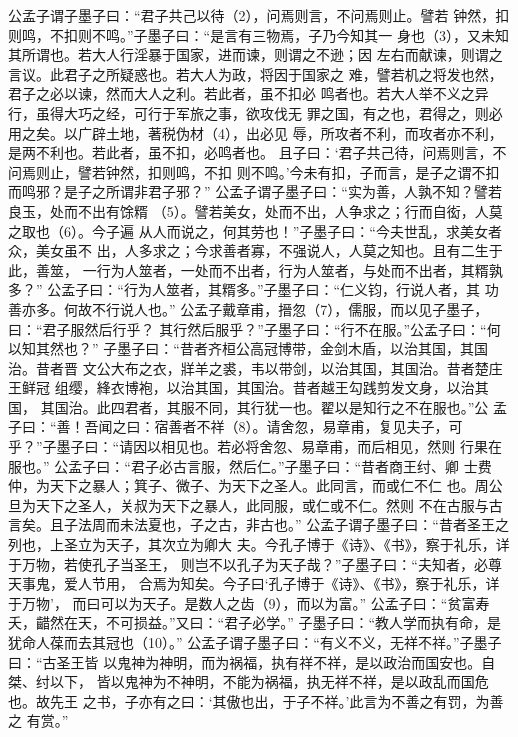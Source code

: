 \documentclass[12pt,UTF8]{ctexbook}
\begin{document}
公孟子谓子墨子曰：“君子共己以待（2），问焉则言，不问焉则止。譬若 
钟然，扣则鸣，不扣则不鸣。”子墨子曰：“是言有三物焉，子乃今知其一 
身也（3），又未知其所谓也。若大人行淫暴于国家，进而谏，则谓之不逊；因 
左右而献谏，则谓之言议。此君子之所疑惑也。若大人为政，将因于国家之 
难，譬若机之将发也然，君子之必以谏，然而大人之利。若此者，虽不扣必 
鸣者也。若大人举不义之异行，虽得大巧之经，可行于军旅之事，欲攻伐无 
罪之国，有之也，君得之，则必用之矣。以广辟土地，著税伪材（4），出必见 
辱，所攻者不利，而攻者亦不利，是两不利也。若此者，虽不扣，必鸣者也。 
且子曰：‘君子共己待，问焉则言，不问焉则止，譬若钟然，扣则鸣，不扣 
则不鸣。’今未有扣，子而言，是子之谓不扣而鸣邪？是子之所谓非君子邪？” 
公孟子谓子墨子曰：“实为善，人孰不知？譬若良玉，处而不出有馀糈 
（5）。譬若美女，处而不出，人争求之；行而自衒，人莫之取也（6）。今子遍 
从人而说之，何其劳也！”子墨子曰：“今夫世乱，求美女者众，美女虽不 
出，人多求之；今求善者寡，不强说人，人莫之知也。且有二生于此，善筮， 
一行为人筮者，一处而不出者，行为人筮者，与处而不出者，其糈孰多？” 
公孟子曰：“行为人筮者，其糈多。”子墨子曰：“仁义钧，行说人者，其 
功善亦多。何故不行说人也。” 
公孟子戴章甫，搢忽（7），儒服，而以见子墨子，曰：“君子服然后行乎？ 
其行然后服乎？”子墨子曰：“行不在服。”公孟子曰：“何以知其然也？” 
子墨子曰：“昔者齐桓公高冠博带，金剑木盾，以治其国，其国治。昔者晋 
文公大布之衣，牂羊之裘，韦以带剑，以治其国，其国治。昔者楚庄王鲜冠 
组缨，綘衣博袍，以治其国，其国治。昔者越王勾践剪发文身，以治其国， 
其国治。此四君者，其服不同，其行犹一也。翟以是知行之不在服也。”公 
孟子曰：“善！吾闻之曰：宿善者不祥（8）。请舍忽，易章甫，复见夫子，可 
乎？”子墨子曰：“请因以相见也。若必将舍忽、易章甫，而后相见，然则 
行果在服也。” 
公孟子曰：“君子必古言服，然后仁。”子墨子曰：“昔者商王纣、卿 
士费仲，为天下之暴人；箕子、微子、为天下之圣人。此同言，而或仁不仁 
也。周公旦为天下之圣人，关叔为天下之暴人，此同服，或仁或不仁。然则 
不在古服与古言矣。且子法周而未法夏也，子之古，非古也。” 
公孟子谓子墨子曰：“昔者圣王之列也，上圣立为天子，其次立为卿大 
夫。今孔子博于《诗》、《书》，察于礼乐，详于万物，若使孔子当圣王， 
则岂不以孔子为天子哉？”子墨子曰：“夫知者，必尊天事鬼，爱人节用， 
合焉为知矣。今子曰‘孔子博于《诗》、《书》，察于礼乐，详于万物’， 
而曰可以为天子。是数人之齿（9），而以为富。” 
公孟子曰：“贫富寿夭，齰然在天，不可损益。”又曰：“君子必学。” 
子墨子曰：“教人学而执有命，是犹命人葆而去其冠也（10）。” 
公孟子谓子墨子曰：“有义不义，无祥不祥。”子墨子曰：“古圣王皆 
以鬼神为神明，而为祸福，执有祥不祥，是以政治而国安也。自桀、纣以下， 
皆以鬼神为不神明，不能为祸福，执无祥不祥，是以政乱而国危也。故先王 
之书，子亦有之曰：‘其傲也出，于子不祥。’此言为不善之有罚，为善之 
有赏。” 
\end{document}
